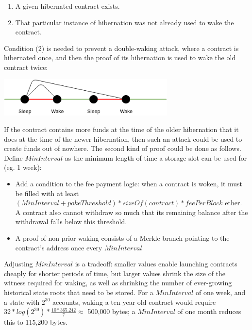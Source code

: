 \documentclass[12pt, final]{article}
\begin{document}
\begin{enumerate}
\item A given hibernated contract exists.
\item That particular instance of hibernation was not already used to wake the contract.
\end{enumerate}

Condition (2) is needed to prevent a double-waking attack, where a contract is hibernated once, and then the proof of its hibernation is used to wake the old contract twice:

\begin{center}
\includegraphics[width=3.5in]{sleepwake.png} \\
\end{center}

If the contract contains more funds at the time of the older hibernation that it does at the time of the newer hibernation, then such an attack could be used to create funds out of nowhere. The second kind of proof could be done as follows. Define $MinInterval$ as the minimum length of time a storage slot can be used for (eg. 1 week):

\begin{itemize}
\item Add a condition to the fee payment logic: when a contract is woken, it must be filled with at least $(MinInterval + pokeThreshold) * sizeOf(contract) * feePerBlock$ ether. A contract also cannot withdraw so much that its remaining balance after the withdrawal falls below this threshold.
\item A proof of non-prior-waking consists of a Merkle branch pointing to the contract's address once every $MinInterval$
\end{itemize}

Adjusting $MinInterval$ is a tradeoff: smaller values enable launching contracts cheaply for shorter periods of time, but larger values shrink the size of the witness required for waking, as well as shrinking the number of ever-growing historical state roots that need to be stored. For a $MinInterval$ of one week, and a state with $2^{30}$ accounts, waking a ten year old contract would require $32 * log(2^30) * \frac{10 * 365.242}{7} \approx$ 500,000 bytes; a $MinInterval$ of one month reduces this to 115,200 bytes.
\end{document}
